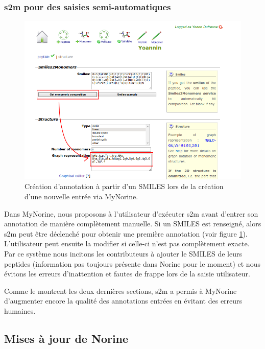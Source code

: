 \subsubsection{s2m pour des saisies semi-automatiques}

\begin{figure}[h!]
  \begin{center}
    \includegraphics[width=450px]{Figures/contributions/s2m_automatic.png}
    \caption{\label{s2m_automatic}Création d'annotation à partir d'un SMILES lors de la création d'une nouvelle entrée via MyNorine.}
  \end{center}
\end{figure}

Dans MyNorine, nous proposons à l'utilisateur d'exécuter s2m avant d'entrer son annotation de manière complètement manuelle.
Si un SMILES est renseigné, alors s2m peut être déclenché pour obtenir une première annotation (voir figure \ref{s2m_automatic}).
L'utilisateur peut ensuite la modifier si celle-ci n'est pas complètement exacte.
Par ce système nous incitons les contributeurs à ajouter le SMILES de leurs peptides (information pas toujours présente dans Norine pour le moment) et nous évitons les erreurs d'inattention et fautes de frappe lors de la saisie utilisateur.

Comme le montrent les deux dernières sections, s2m a permis à MyNorine d'augmenter encore la qualité des annotations entrées en évitant des erreurs humaines.




\subsection{Mises à jour de Norine}

